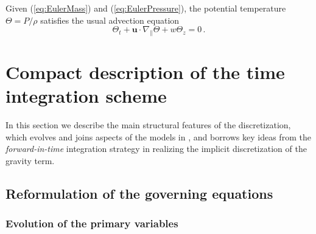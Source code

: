 \documentclass[12pt,a4paper]{article}
\theoremstyle{definition}
\newcommand{\eq}[1]{(\ref{#1})}
\newcommand{\vect}[1]{{\mathbf{#1}}}
\newcommand{\vu}{\vect{u}}
\begin{document}
Given \eq{eq:EulerMass} and \eq{eq:EulerPressure}, the potential temperature
$\Theta = P/\rho$ satisfies the usual advection equation
%
\begin{equation}
\Theta_t + \vu\cdot\nabla_\parallel \Theta + w \Theta_z = 0\,.
\end{equation}


\section{Compact description of the time integration scheme}
\label{sec:TimeDiscretizationSummary}

In this section we describe the main structural features of the discretization, which evolves and joins aspects of the models in \cite{KleinTCFD2009,BenacchioEtAl2014}, and borrows key ideas from the \emph{forward-in-time} integration strategy \cite{SmolarkiewiczMargolin1997, SmolarkiewiczMargolin1993} in realizing the implicit discretization of the gravity term. 


\subsection{Reformulation of the governing equations}
\label{ssec:Reformulation}


\subsubsection{Evolution of the primary variables}
\label{sssec:PrimaryVariables}
\end{document}
